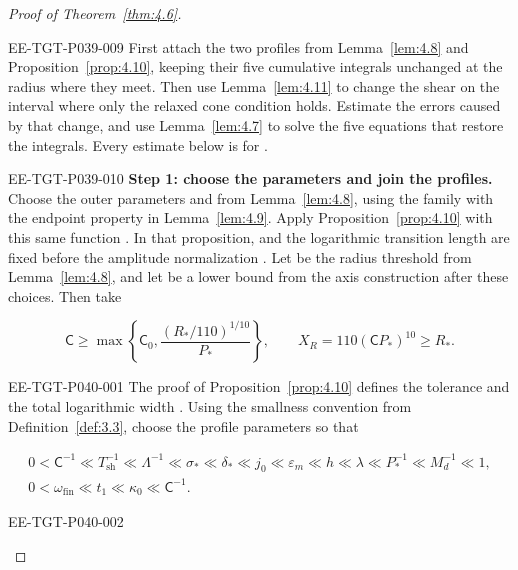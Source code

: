 \begin{proof}[Proof of Theorem~\ref{thm:4.6}]
\begin{EESegment}{EE-TGT-P039-009}
First attach the two profiles from Lemma~\ref{lem:4.8} and Proposition~\ref{prop:4.10}, keeping
their five cumulative integrals unchanged at the radius where they meet. Then use
Lemma~\ref{lem:4.11} to change the shear on the interval where only the relaxed cone condition
holds. Estimate the errors caused by that change, and use Lemma~\ref{lem:4.7} to solve the five
equations that restore the integrals. Every estimate below is for
.
\end{EESegment}

\begin{EESegment}{EE-TGT-P039-010}
\noindent\textbf{Step 1: choose the parameters and join the profiles.}
Choose the outer parameters  and
 from Lemma~\ref{lem:4.8}, using the family with the endpoint
property in Lemma~\ref{lem:4.9}. Apply Proposition~\ref{prop:4.10} with this same function
. In that proposition,  and the logarithmic
transition length  are fixed before the amplitude normalization
. Let  be the radius threshold from
Lemma~\ref{lem:4.8}, and let  be a lower bound from the axis
construction after these choices. Then take
\end{EESegment}
\[
\mathsf C\ge\max\!\left\{\mathsf C_0,\frac{(R_*/110)^{1/10}}{P_*}\right\},
\qquad
X_R=110(\mathsf C P_*)^{10}\ge R_*.
\]
\begin{EESegment}{EE-TGT-P040-001}
The proof of Proposition~\ref{prop:4.10} defines the tolerance
 and the total logarithmic width
. Using the smallness convention from
Definition~\ref{def:3.3}, choose the profile parameters so that
\end{EESegment}
\begin{gather*}
0<\mathsf C^{-1}\ll T_{\mathrm{sh}}^{-1}\ll\Lambda^{-1}\ll\sigma_*\ll\delta_*\ll j_0
\ll\varepsilon_m\ll h\ll\lambda\ll P_*^{-1}\ll M_d^{-1}\ll1,\\
0<\omega_{\mathrm{fin}}\ll t_1\ll\kappa_0\ll \mathsf C^{-1}.
\end{gather*}
\begin{EESegment}{EE-TGT-P040-002}

\end{EESegment}
\end{proof}
